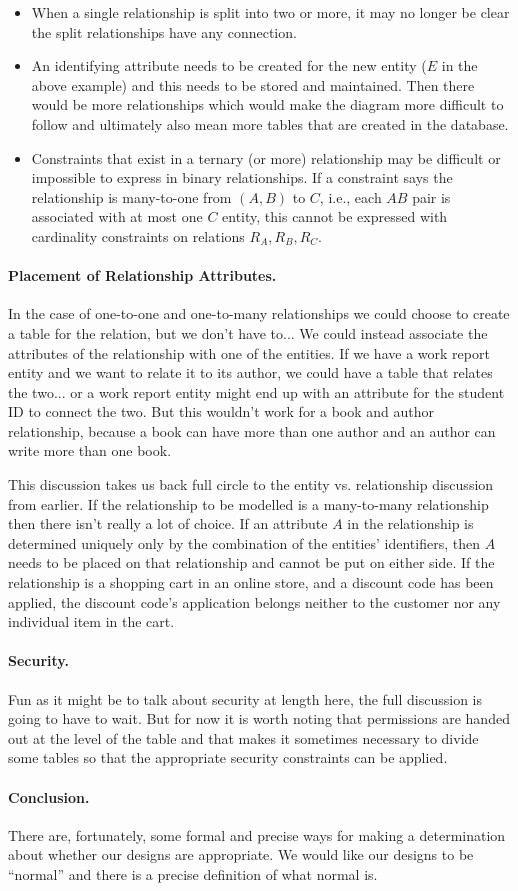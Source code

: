 \begin{itemize}
	\item When a single relationship is split into two or more, it may no longer be clear the split relationships have any connection. 
	\item An identifying attribute needs to be created for the new entity ($E$ in the above example) and this needs to be stored and maintained. Then there would be more relationships which would make the diagram more difficult to follow and ultimately also mean more tables that are created in the database.
	\item Constraints that exist in a ternary (or more) relationship may be difficult or impossible to express in binary relationships. If a constraint says the relationship is many-to-one from $(A, B)$ to $C$, i.e., each $AB$ pair is associated with at most one $C$ entity, this cannot be expressed with cardinality constraints on relations $R_{A}, R_{B}, R_{C}$.
\end{itemize}

\paragraph{Placement of Relationship Attributes.} 

In the case of one-to-one and one-to-many relationships we could choose to create a table for the relation, but we don't have to... We could instead associate the attributes of the relationship with one of the entities. If we have a work report entity and we want to relate it to its author, we could have a table that relates the two... or a work report entity might end up with an attribute for the student ID to connect the two. But this wouldn't work for a book and author relationship, because a book can have more than one author and an author can write more than one book.

This discussion takes us back full circle to the entity vs. relationship discussion from earlier. If the relationship to be modelled is a many-to-many relationship then there isn't really a lot of choice. If an attribute $A$ in the relationship is determined uniquely only by the combination of the entities' identifiers, then $A$ needs to be placed on that relationship and cannot be put on either side. If the relationship is a shopping cart in an online store, and a discount code has been applied, the discount code's application belongs neither to the customer nor any individual item in the cart.

\paragraph{Security.} Fun as it might be to talk about security at length here, the full discussion is going to have to wait. But for now it is worth noting that permissions are handed out at the level of the table and that makes it sometimes necessary to divide some tables so that the appropriate security constraints can be applied. 

\paragraph{Conclusion.} There are, fortunately, some formal and precise ways for making a determination about whether our designs are appropriate. We would like our designs to be ``normal'' and there is a precise definition of what normal is. 




